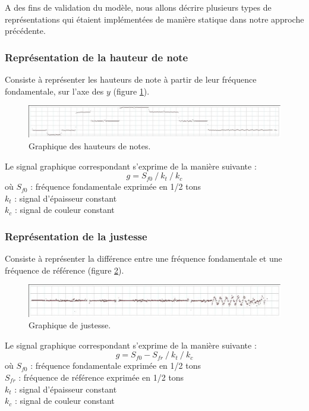 \documentclass{article}
\newcommand{\rshift}			{\hspace*{4mm}}
\begin{document}
A des fins de validation du modèle, nous allons décrire plusieurs types de représentations qui étaient implémentées de manière statique dans notre approche précédente.
 
\subsubsection{Représentation de la hauteur de note}
Consiste à représenter les hauteurs de note à partir de leur fréquence fondamentale, sur l'axe des $y$ (figure \ref{fig:pitch}).
\begin{figure}[htbp]
\centerline{
	\includegraphics[width=0.99\columnwidth]{imgs/curves/pitch}}
\caption{Graphique des hauteurs de notes.}
\label{fig:pitch}
\end{figure}

Le signal graphique correspondant s'exprime de la manière suivante :
\[ g = S_{f0}\ /\ k_t\ /\ k_c \]
où $S_{f0}$ : fréquence fondamentale exprimée en 1/2 tons\\
\rshift	 $k_t$ : signal d'épaisseur constant \\
\rshift	 $k_c$ : signal de couleur constant 
 
\subsubsection{Représentation de la justesse}
Consiste à représenter la différence entre une fréquence fondamentale et une fréquence de référence 
(figure \ref{fig:finepitch}).
\begin{figure}[h]
\centerline{
	\includegraphics[width=0.99\columnwidth]{imgs/curves/finepitch}}
\caption{Graphique de justesse.}
\label{fig:finepitch}
\end{figure}

Le signal graphique correspondant s'exprime de la manière suivante :
\[ g = S_{f0}-S_{fr}\ /\ k_t\ /\ k_c \]
où $S_{f0}$ : fréquence fondamentale  exprimée en 1/2 tons\\
\rshift	 $S_{fr}$ : fréquence de référence  exprimée en 1/2 tons\\
\rshift	 $k_t$ : signal d'épaisseur constant \\
\rshift	 $k_c$ : signal de couleur constant 
 
\end{document}
